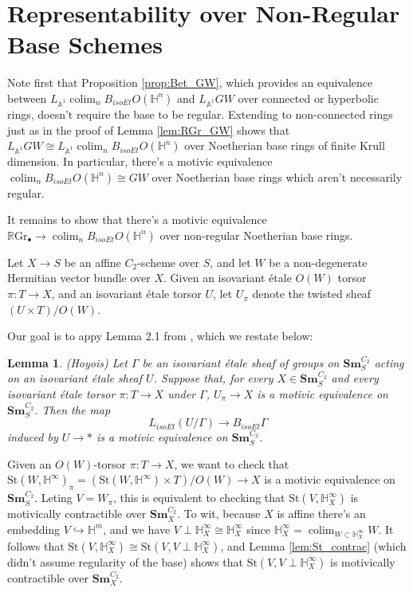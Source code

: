 \documentclass[edeposit,fullpage]{uiucthesis2009}
\newcommand{\mbb}{\mathbb}
\newcommand{\RGr}{\mathbb R\mathrm{Gr}}
\newcommand{\Sm}[1]{\mathbf{Sm}_{#1}}
\newcommand{\St}{\mathrm{St}}
\DeclareMathOperator*{\colim}{colim}
\theoremstyle{plain}
\newtheorem{lemma}{Lemma}
\numberwithin{lemma}{section}
\theoremstyle{definition}
\begin{document}
\section{Representability over Non-Regular Base Schemes}\label{sec:repr_nonreg}

Note first that Proposition \ref{prop:Bet_GW}, which provides an 
equivalence between $L_{\mbb A^1}\colim_n B_{isoEt}O(\mbb H^n)$ and $L_{\mbb A^1}GW$
over connected or hyperbolic rings, doesn't require the base
to be regular. Extending to non-connected rings just as in the proof
of Lemma \ref{lem:RGr_GW} shows that $L_{\mbb A^1}GW \cong
L_{\mbb A^1} \colim_n B_{isoEt}O(\mbb H^n)$ over Noetherian base rings of finite Krull dimension. In particular,
there's a motivic equivalence $\colim_n B_{isoEt}O(\mbb H^n) \cong GW$ over Noetherian
base rings which aren't necessarily regular.

It remains to show that there's a motivic equivalence $\RGr_\bullet
\rightarrow \colim_n B_{isoEt}O(\mbb H^n)$ over non-regular Noetherian base rings. 

Let  $X \rightarrow S$ be an affine
$C_2$-scheme over $S$, and let $W$ be a non-degenerate Hermitian
vector bundle over $X$. Given an isovariant \'etale $O(W)$
torsor $\pi : T \rightarrow X$, and an isovariant \'etale torsor $U$, let $U_\pi$ denote
the twisted sheaf $(U \times T)/O(W)$. 

Our goal is to appy Lemma 2.1 from \cite{cdhdesc}, which we restate below:

\begin{lemma}(Hoyois)
Let $\Gamma$ be an isovariant \'etale sheaf of groups on $\Sm{S}^{C_2}$
acting on an isovariant \'etale sheaf $U$. Suppose that, for every $X
\in \Sm{S}^{C_2}$ and every isovariant \'etale torsor $\pi: T
\rightarrow X$ under $\Gamma$, $U_\pi \rightarrow X$ is a motivic
equivalence on $\Sm{S}^{C_2}$. Then the map
\[
L_{isoEt}(U/\Gamma) \rightarrow B_{isoEt}\Gamma
\]
induced by $U \rightarrow \ast$ is a motivic equivalence on $\Sm{S}^{C_2}$.
\end{lemma}

Given an $O(W)$-torsor $\pi : T \rightarrow X$, we want to check that $\St(W,\mbb H^\infty)_\pi  =(\St(W,\mbb H^\infty) \times T)/O(W) \rightarrow
X$ is a motivic equivalence on $\Sm{S}^{C_2}$. Leting $V = W_\pi$,
this is equivalent to checking
that $\St(V,\mbb H^\infty_X)$ is motivically contractible
over $\Sm{X}^{C_2}$. To wit, because $X$ is affine there's an
embedding $V \hookrightarrow \mbb H^m$, and we have $V \perp \mbb
H^\infty_X \cong \mbb H^\infty_X$ since $\mbb H^\infty_X = \colim_{W
  \subset \mbb H^\infty_X} W$. It follows that $\St(V,\mbb H^\infty_X)
\cong \St(V,V \perp \mbb H^\infty_X)$, and Lemma
\ref{lem:St_contrac} (which didn't assume regularity of the base) shows
that $\St(V,V \perp \mbb H^\infty_X)$ is motivically contractible over
$\Sm{X}^{C_2}$. 
\end{document}
